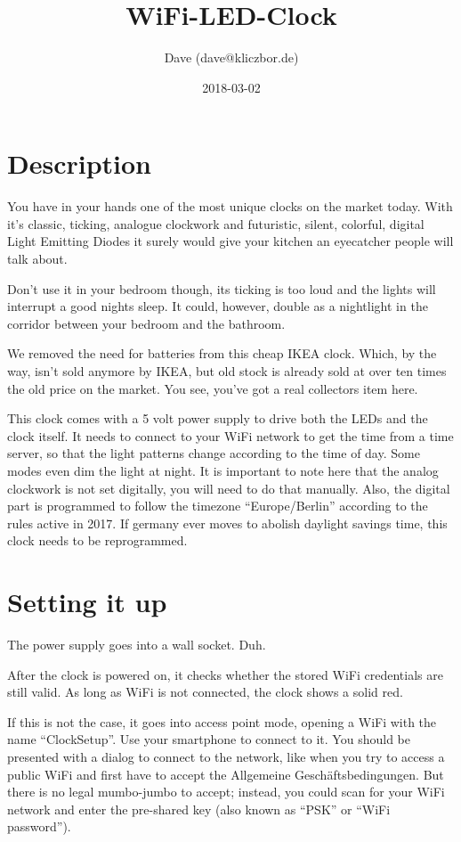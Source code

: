 \documentclass[a4paper,10pt,twocolumn]{article}
\title{WiFi-LED-Clock}
\author{Dave (dave@kliczbor.de)}
\date{2018-03-02}
\begin{document}
\maketitle
 
\section{Description}
You have in your hands one of the most unique clocks on the market today. With it's
classic, ticking, analogue clockwork and futuristic, silent, colorful, digital Light 
Emitting Diodes it surely would give your kitchen an eyecatcher people will talk about.

Don't use it in your bedroom though, its ticking is too loud and the lights will 
interrupt a good nights sleep. It could, however, double as a nightlight in the corridor
between your bedroom and the bathroom.

We removed the need for batteries from this cheap IKEA clock. Which, by the way, isn't sold
anymore by IKEA, but old stock is already sold at over ten times the old price on the market.
You see, you've got a real collectors item here.

This clock comes with a 5 volt power supply to drive both the LEDs and the clock itself.
It needs to connect to your WiFi network to get the time from a time server, so that the light
patterns change according to the time of day. Some modes even dim the light at night. It is
important to note here that the analog clockwork is not set digitally, you will need to 
do that manually. Also, the digital part is programmed to follow the timezone ``Europe/Berlin''
according to the rules active in 2017. If germany ever moves to abolish daylight savings time,
this clock needs to be reprogrammed.

\section{Setting it up}

The power supply goes into a wall socket. Duh.

After the clock is powered on, it checks whether the stored 
WiFi credentials are still valid. As long as WiFi is not connected, 
the clock shows a solid red.

If this is not the case, it goes into access point mode, opening a WiFi with the name 
``ClockSetup''. Use your smartphone to connect to it. You should be presented with a
dialog to connect to the network, like when you try to access a public WiFi and first have
to accept the Allgemeine Geschäftsbedingungen. But there is no legal mumbo-jumbo to accept; 
instead, you could scan for your WiFi network and enter the pre-shared key (also known 
as ``PSK'' or ``WiFi password'').
\end{document}
